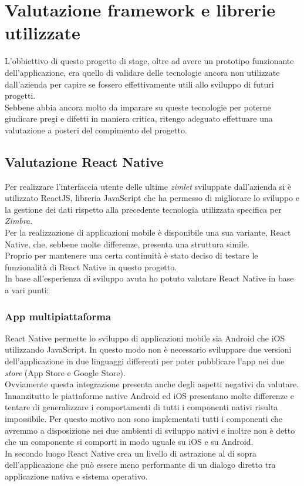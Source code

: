 \section{Valutazione framework e librerie utilizzate}
L'obbiettivo di questo progetto di stage, oltre ad avere un prototipo funzionante dell'applicazione, era quello di validare delle tecnologie ancora non utilizzate dall'azienda per capire se fossero effettivamente utili allo sviluppo di futuri progetti. \\
Sebbene abbia ancora molto da imparare su queste tecnologie per poterne giudicare pregi e difetti in maniera critica, ritengo adeguato effettuare una valutazione a posteri del compimento del progetto.
\subsection{Valutazione React Native}
Per realizzare l'interfaccia utente delle ultime \emph{zimlet} sviluppate dall'azienda si è utilizzato ReactJS, libreria JavaScript che ha permesso di migliorare lo sviluppo e la gestione dei dati rispetto alla precedente tecnologia utilizzata specifica per \emph{Zimbra}. \\
Per la realizzazione di applicazioni mobile è disponibile una sua variante, React Native, che, sebbene molte differenze, presenta una struttura simile. \\
Proprio per mantenere una certa continuità è stato deciso di testare le funzionalità di React Native in questo progetto. \\
In base all'esperienza di sviluppo avuta ho potuto valutare React Native in base a vari punti:
\subsubsection{App multipiattaforma}
React Native permette lo sviluppo di applicazioni mobile sia Android che iOS utilizzando JavaScript. In questo modo non è necessario sviluppare due versioni dell'applicazione in due linguaggi differenti per poter pubblicare l'app nei due \emph{store} (App Store e Google Store). \\
Ovviamente questa integrazione presenta anche degli aspetti negativi da valutare. Innanzitutto le piattaforme native Android ed iOS presentano molte differenze e tentare di generalizzare i comportamenti di tutti i componenti nativi risulta impossibile. Per questo motivo non sono implementati tutti i componenti che avremmo a disposizione nei due ambienti di sviluppo nativi e inoltre non è detto che un componente si comporti in modo uguale su iOS e su Android. \\
In secondo luogo React Native crea un livello di astrazione al di sopra dell’applicazione che può essere meno performante di un dialogo diretto tra applicazione nativa e sistema operativo.
